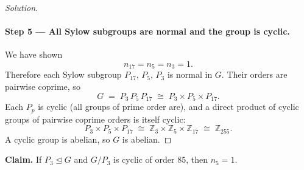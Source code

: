 \documentclass[12pt]{article}
\theoremstyle{definition} %
\theoremstyle{plain} %
\begin{document}
\begin{proof}[Solution]
    \paragraph{Step 5 — All Sylow subgroups are normal and the group is cyclic.}
    We have shown
    \[
        n_{17}=n_{5}=n_{3}=1.
    \]
    Therefore each Sylow subgroup
    \(
        P_{17},\,P_{5},\,P_{3}
    \)
    is normal in $G$.  
    Their orders are pairwise coprime, so
    \[
        G\;=\;P_{3}\,P_{5}\,P_{17}\;\cong\;P_{3}\times P_{5}\times P_{17}.
    \]
    Each $P_{p}$ is cyclic (all groups of prime order are), and a direct product of cyclic groups of pairwise coprime orders is itself cyclic:
    \[
        P_{3}\times P_{5}\times P_{17}\;\cong\;\mathbb Z_{3}\times\mathbb Z_{5}\times\mathbb Z_{17}
                                            \;\cong\;\mathbb Z_{255}.
    \]
    A cyclic group is abelian, so $G$ is abelian.
    \end{proof}
    \textbf{Claim.} If $P_{3}\trianglelefteq G$ and $G/P_{3}$ is cyclic of
order $85$, then $n_{5}=1$.
\end{document}
